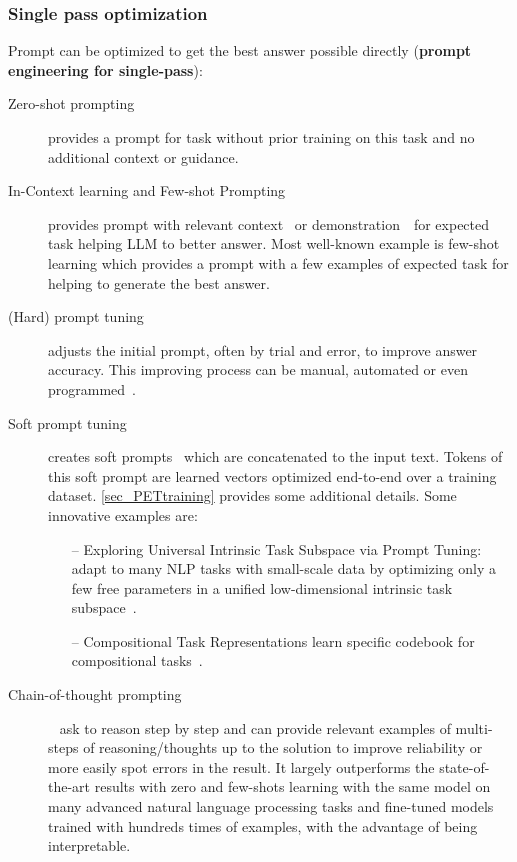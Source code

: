 \documentclass[acmsmall]{acmart}
\begin{document}
\subsubsection{Single pass optimization}
Prompt can be optimized to get the best answer possible directly (\textbf{prompt engineering for single-pass}):
    \begin{description}
            \item [Zero-shot prompting] provides a prompt for task without prior training on this task and no additional context or guidance.
            \item [In-Context learning and Few-shot Prompting] provides prompt with relevant context~\citep{brownLanguageModelsAre2020, rubinLearningRetrievePrompts2022} or demonstration~\citep{minRethinkingRoleDemonstrations2022} for expected task helping LLM to better answer. Most well-known example is few-shot learning which provides a prompt with a few examples of expected task for helping to generate the best answer.
            \item [(Hard) prompt tuning] adjusts the initial prompt, often by trial and error, to improve answer accuracy. This improving process can be manual, automated or even programmed~\citep{beurer-kellnerPromptingProgrammingQuery2022}.
            \item [Soft prompt tuning] creates soft prompts~\citep{lesterPowerScaleParameterEfficient2021} which are concatenated to the input text. Tokens of this soft prompt are learned vectors optimized end-to-end over a training dataset. \autoref{sec_PETtraining} provides some additional details. Some innovative examples are:
                \begin{itemize}
                    \item[--] {Exploring Universal Intrinsic Task Subspace via Prompt Tuning}: adapt to many NLP tasks with small-scale data by optimizing only a few free parameters in a unified low-dimensional intrinsic task subspace~\citep{qinExploringUniversalIntrinsic2022}.
                    \item[--] {Compositional Task Representations} learn specific codebook for compositional tasks~\citep{shaoCompositionalTaskRepresentations2023}.
                \end{itemize}
            \item [Chain-of-thought prompting]~\citep{weiChainThoughtPrompting2022, fuComplexityBasedPromptingMultiStep2023} ask to reason step by step and can provide relevant examples of multi-steps of reasoning/thoughts up to the solution to improve reliability or more easily spot errors in the result. It largely outperforms the state-of-the-art results with zero and few-shots learning with the same model on many advanced natural language processing tasks and fine-tuned models trained with hundreds times of examples, with the advantage of being interpretable.

\end{description}
\end{document}
